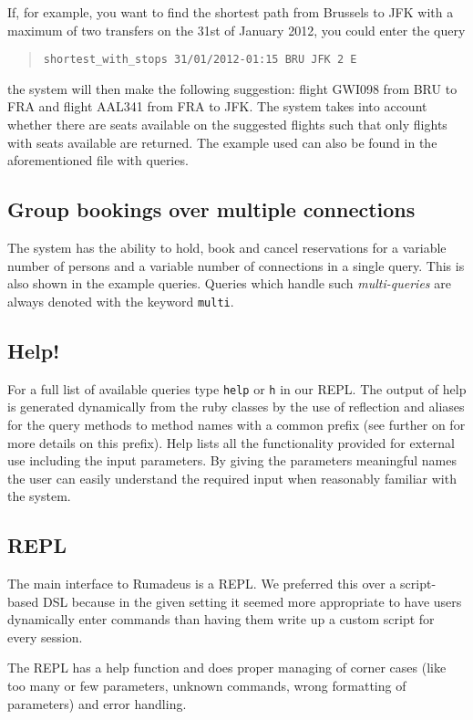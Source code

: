 \documentclass[11pt,pdftex,oneside]{article}
\begin{document}
If, for example, you want to find the shortest path from Brussels to JFK
with a maximum of two transfers on the 31st of January 2012, you could
enter the query
\begin{quote}
  \begin{verbatim}
shortest_with_stops 31/01/2012-01:15 BRU JFK 2 E
  \end{verbatim}
\end{quote}
the system will then make the following suggestion:
flight GWI098 from BRU to FRA and flight AAL341 from FRA to JFK.
The system takes into account whether there are seats available on the
suggested flights such that only flights with seats available are returned.
The example used can also be found in the aforementioned file with queries.

\subsection{Group bookings over multiple connections}
The system has the ability to hold, book and cancel reservations for a
variable number of persons and a variable number of connections in a
single query.
This is also shown in the example queries.
Queries which handle such \emph{multi-queries} are always denoted with the
keyword {\tt multi}.

\subsection{Help!}
For a full list of available queries type {\tt help} or {\tt h} in our
REPL.
The output of help is generated dynamically from the ruby classes by the
use of reflection and aliases for the query methods to method names with a
common prefix (see further on for more details on this prefix).
Help lists all the functionality provided for external use including the
input parameters.
By giving the parameters meaningful names the user can easily understand
the required input when reasonably familiar with the system.

\subsection{REPL}
The main interface to Rumadeus is a REPL.
We preferred this over a script-based DSL because in the given setting it
seemed more appropriate to have users dynamically enter commands than
having them write up a custom script for every session.

The REPL has a help function and does proper managing of corner cases
(like too many or few parameters, unknown commands, wrong formatting of
parameters) and error handling.
\end{document}
